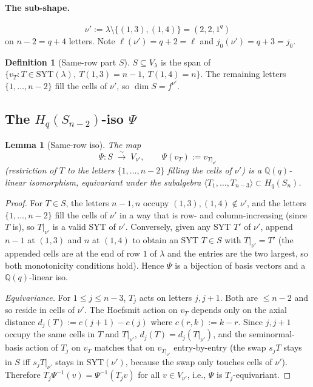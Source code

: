 \documentclass[11pt]{article}
\newtheorem{lemma}[theorem]{Lemma}
\theoremstyle{definition}
\newtheorem{definition}[theorem]{Definition}
\begin{document}
\paragraph{The sub-shape.}
\[
   \nu' := \lambda \setminus \{(1, 3), (1, 4)\} = (2, 2, 1^q)
\]
on $n - 2 = q + 4$ letters. Note $\ell(\nu') = q + 2 = \ell$ and
$j_0(\nu') = q + 3 = j_0$.

\begin{definition}[Same-row part $S$]\label{def:S}
$S \subseteq V_\lambda$ is the span of $\{v_T : T \in
\mathrm{SYT}(\lambda),\ T(1, 3) = n - 1,\ T(1, 4) = n\}$. The
remaining letters $\{1, \ldots, n - 2\}$ fill the cells of $\nu'$, so
$\dim S = f^{\nu'}$.
\end{definition}

\subsection{The $H_q(S_{n-2})$-iso $\Psi$}\label{sec:Psi}

\begin{lemma}[Same-row iso]\label{lem:Psi}
The map
\[
   \Psi: S \;\xrightarrow{\sim}\; V_{\nu'},
   \qquad \Psi(v_T) := v_{T|_{\nu'}}
\]
(restriction of $T$ to the letters $\{1, \ldots, n - 2\}$ filling the
cells of $\nu'$) is a $\mathbb{Q}(q)$-linear isomorphism, equivariant
under the subalgebra $\langle T_1, \ldots, T_{n-3} \rangle \subset
H_q(S_n)$.
\end{lemma}

\begin{proof}
For $T \in S$, the letters $n - 1, n$ occupy $(1, 3), (1, 4) \notin
\nu'$, and the letters $\{1, \ldots, n - 2\}$ fill the cells of $\nu'$
in a way that is row- and column-increasing (since $T$ is), so
$T|_{\nu'}$ is a valid SYT of $\nu'$. Conversely, given any SYT $T'$
of $\nu'$, append $n - 1$ at $(1, 3)$ and $n$ at $(1, 4)$ to obtain an
SYT $T \in S$ with $T|_{\nu'} = T'$ (the appended cells are at the
end of row $1$ of $\lambda$ and the entries are the two largest, so
both monotonicity conditions hold). Hence $\Psi$ is a bijection of
basis vectors and a $\mathbb{Q}(q)$-linear iso.

\emph{Equivariance.} For $1 \le j \le n - 3$, $T_j$ acts on letters
$j, j + 1$. Both are $\le n - 2$ and so reside in cells of $\nu'$.
The Hoefsmit action on $v_T$ depends only on the axial distance
$d_j(T) := c(j+1) - c(j)$ where $c(r, k) := k - r$. Since $j, j+1$
occupy the same cells in $T$ and $T|_{\nu'}$, $d_j(T) = d_j(T|_{\nu'})$,
and the seminormal-basis action of $T_j$ on $v_T$ matches that on
$v_{T|_{\nu'}}$ entry-by-entry (the swap $s_j T$ stays in $S$ iff
$s_j T|_{\nu'}$ stays in $\mathrm{SYT}(\nu')$, because the swap only
touches cells of $\nu'$). Therefore $T_j \Psi^{-1}(v) = \Psi^{-1}(T_j v)$
for all $v \in V_{\nu'}$, i.e., $\Psi$ is $T_j$-equivariant.
\end{proof}
\end{document}

